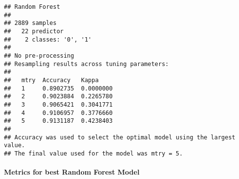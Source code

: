 \documentclass[
]{article}
\newenvironment{Shaded}{\begin{snugshade}}{\end{snugshade}}
\newcommand{\DataTypeTok}[1]{\textcolor[rgb]{0.13,0.29,0.53}{#1}}
\newcommand{\DecValTok}[1]{\textcolor[rgb]{0.00,0.00,0.81}{#1}}
\newcommand{\KeywordTok}[1]{\textcolor[rgb]{0.13,0.29,0.53}{\textbf{#1}}}
\newcommand{\NormalTok}[1]{#1}
\newcommand{\OperatorTok}[1]{\textcolor[rgb]{0.81,0.36,0.00}{\textbf{#1}}}
\newcommand{\StringTok}[1]{\textcolor[rgb]{0.31,0.60,0.02}{#1}}
\begin{document}
\begin{verbatim}
## Random Forest 
## 
## 2889 samples
##   22 predictor
##    2 classes: '0', '1' 
## 
## No pre-processing
## Resampling results across tuning parameters:
## 
##   mtry  Accuracy   Kappa    
##   1     0.8902735  0.0000000
##   2     0.9023884  0.2265780
##   3     0.9065421  0.3041771
##   4     0.9106957  0.3776660
##   5     0.9131187  0.4238403
## 
## Accuracy was used to select the optimal model using the largest value.
## The final value used for the model was mtry = 5.
\end{verbatim}

\hypertarget{metrics-for-best-random-forest-model}{%
\paragraph{Metrics for best Random Forest
Model}\label{metrics-for-best-random-forest-model}}

\begin{Shaded}
\end{Shaded}
\end{document}
